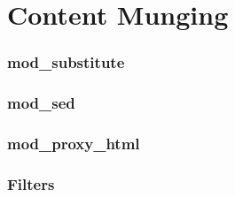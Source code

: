 \part{Content Munging}

\section{mod\_substitute}

\section{mod\_sed}

\section{mod\_proxy\_html}

\section{Filters}

